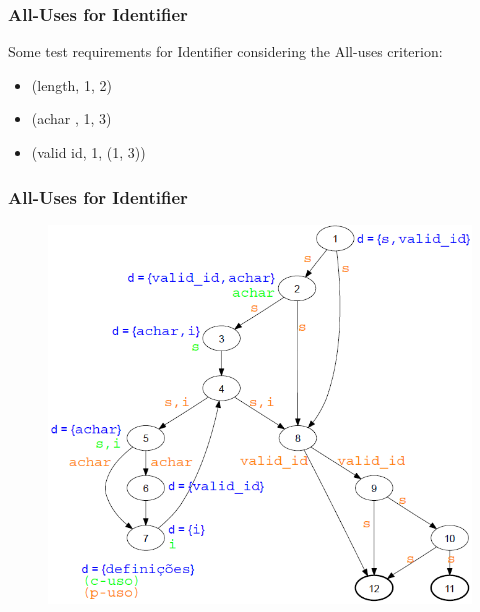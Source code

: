 \begin{frame}[hasprev=false,hasnext=true]
\label{example:identifier-all-uses}
\frametitle{All-Uses for Identifier}

Some test requirements for Identifier considering the All-uses criterion:
\begin{itemize}
	\item (length, 1, 2)
	\item (achar , 1, 3)
	\item (valid id, 1, (1, 3))
\end{itemize}

\end{frame}

\begin{frame}[c, hasprev=true, hasnext=false]
\frametitle{All-Uses for Identifier}

\begin{figure}
	\centering
	\includegraphics[scale=.3]{aux/examples/identifier-all-uses/identifier-java-dug}
\end{figure}
\end{frame}
